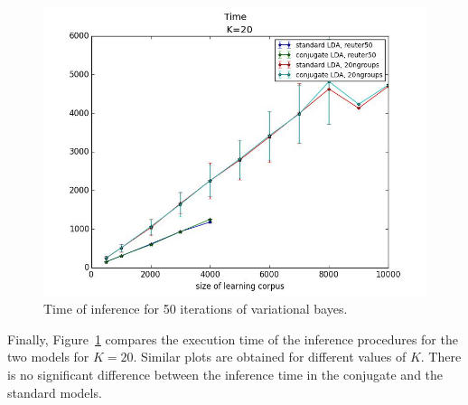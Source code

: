 
\begin{figure}[ht]
\includegraphics[scale=0.4]{results/time}
\caption{\label{fig:time}Time of inference for 50 iterations of variational bayes.}
\end{figure}
Finally, Figure~\ref{fig:time} compares the execution time of the inference procedures for the two models for $K=20$. Similar plots are obtained for different values of $K$. There is no significant difference between the inference time in the conjugate and the standard models.
